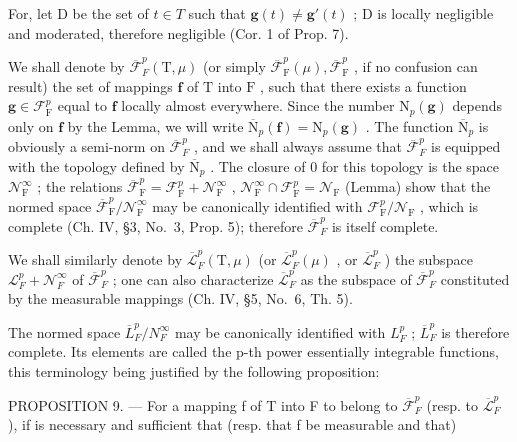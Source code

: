 For, let D be the set of \(t \in T\) such that \(\mathbf{g}(t) \neq \mathbf{g}'(t)\) ; D is locally negligible and moderated, therefore negligible (Cor. 1 of Prop. 7).

We shall denote by \(\overline{\mathcal{F}}_F^p (\mathrm{T},\mu)\) (or simply \(\overline{\mathcal{F}}_{\mathrm{F}}^{p}(\mu),\overline{\mathcal{F}}_{\mathrm{F}}^{p}\) , if no confusion can result) the set of mappings \(\mathbf{f}\) of \(\mathrm{T}\) into \(\mathrm{F}\) , such that there exists a function \(\mathbf{g}\in \mathcal{F}_{\mathrm{F}}^{p}\) equal to \(\mathbf{f}\) locally almost everywhere. Since the number \(\mathrm{N}_p(\mathbf{g})\) depends only on \(\mathbf{f}\) by the Lemma, we will write \(\overline{\mathrm{N}}_p(\mathbf{f}) = \mathrm{N}_p(\mathbf{g})\) . The function \(\overline{\mathrm{N}}_p\) is obviously a semi-norm on \(\overline{\mathcal{F}}_F^p\) , and we shall always assume that \(\overline{\mathcal{F}}_F^p\) is equipped with the topology defined by \(\overline{\mathrm{N}}_p\) . The closure of 0 for this topology is the space \(\mathcal{N}_{\mathrm{F}}^{\infty}\) ; the relations \(\overline{\mathcal{F}}_{\mathrm{F}}^{p} = \mathcal{F}_{\mathrm{F}}^{p} + \mathcal{N}_{\mathrm{F}}^{\infty}\) , \(\mathcal{N}_{\mathrm{F}}^{\infty}\cap \mathcal{F}_{\mathrm{F}}^{p} = \mathcal{N}_{\mathrm{F}}\) (Lemma) show that the normed space \(\overline{\mathcal{F}}_{\mathrm{F}}^{p} / \mathcal{N}_{\mathrm{F}}^{\infty}\) may be canonically identified with \(\mathcal{F}_{\mathrm{F}}^{p} / \mathcal{N}_{\mathrm{F}}\) , which is complete (Ch. IV, §3, No.~3, Prop. 5); therefore \(\overline{\mathcal{F}}_F^p\) is itself complete.

We shall similarly denote by \(\overline{\mathcal{L}}_F^p (\mathrm{T},\mu)\) (or \(\overline{\mathcal{L}}_F^p (\mu)\) , or \(\overline{\mathcal{L}}_F^p\) ) the subspace \(\mathcal{L}_F^p +\mathcal{N}_F^\infty\) of \(\overline{\mathcal{F}}_F^p\) ; one can also characterize \(\overline{\mathcal{L}}_F^p\) as the subspace of \(\overline{\mathcal{F}}_F^p\) constituted by the measurable mappings (Ch. IV, §5, No.~6, Th. 5).

The normed space \(\overline{L}_{F}^{p}/N_{F}^{\infty}\) may be canonically identified with \(L_{F}^{p}\) ; \(\overline{L}_{F}^{p}\) is therefore complete. Its elements are called the p-th power essentially integrable functions, this terminology being justified by the following proposition:

PROPOSITION 9. --- For a mapping f of T into F to belong to \(\overline{\mathcal{F}}_F^p\) (resp. to \(\overline{\mathcal{L}}_F^p\) ), if is necessary and sufficient that (resp. that f be measurable and that)

